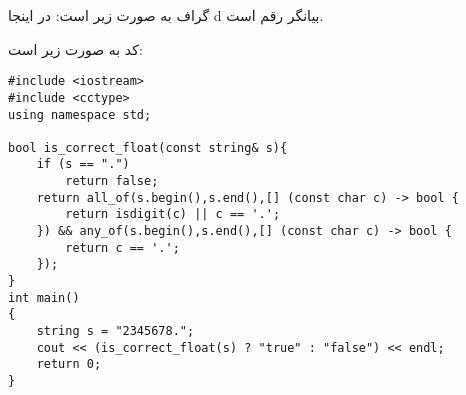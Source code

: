 

گراف به صورت زیر است:
در اینجا d بیانگر رقم است.
\begin{latin}
\end{latin}
\newpage
کد به صورت زیر است:
\begin{latin}
    \begin{lstlisting}
#include <iostream>
#include <cctype>
using namespace std;

bool is_correct_float(const string& s){
    if (s == ".")
        return false;
    return all_of(s.begin(),s.end(),[] (const char c) -> bool {
        return isdigit(c) || c == '.';
    }) && any_of(s.begin(),s.end(),[] (const char c) -> bool {
        return c == '.';
    });
}
int main()
{
    string s = "2345678.";
    cout << (is_correct_float(s) ? "true" : "false") << endl;
    return 0;
}
    \end{lstlisting}
\end{latin}
